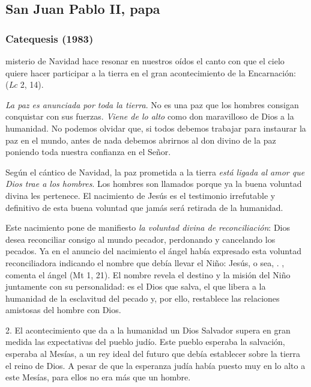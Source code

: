 \newsection


\subsection{San Juan Pablo II, papa}

\subsubsection{Catequesis (1983)}


\begin{body}
	 misterio de Navidad hace resonar en nuestros oídos el canto con que el cielo quiere hacer participar a la tierra en el gran acontecimiento de la Encarnación:  (\emph{Lc} 2, 14).
	
	\emph{La paz es anunciada por toda la tierra}. No es una paz que los hombres consigan conquistar con sus fuerzas. \emph{Viene de lo alto} como don maravilloso de Dios a la humanidad. No podemos olvidar que, si todos debemos trabajar para instaurar la paz en el mundo, antes de nada debemos abrirnos al don divino de la paz poniendo toda nuestra confianza en el Señor.
	
	Según el cántico de Navidad, la paz prometida a la tierra \emph{está ligada al amor que Dios trae a los hombres}. Los hombres son llamados  porque ya la buena voluntad divina les pertenece. El nacimiento de Jesús es el testimonio irrefutable y definitivo de esta buena voluntad que jamás será retirada de la humanidad.
	
	Este nacimiento pone de manifiesto \emph{la voluntad divina de reconciliación}: Dios desea reconciliar consigo al mundo pecador, perdonando y cancelando los pecados. Ya en el anuncio del nacimiento el ángel había expresado esta voluntad reconciliadora indicando el nombre que debía llevar el Niño: Jesús, o sea, . , comenta el ángel (Mt 1, 21). El nombre revela el destino y la misión del Niño juntamente con su personalidad: es el Dios que salva, el que libera a la humanidad de la esclavitud del pecado y, por ello, restablece las relaciones amistosas del hombre con Dios.
	
	2. El acontecimiento que da a la humanidad un Dios Salvador supera en gran medida las expectativas del pueblo judío. Este pueblo esperaba la salvación, esperaba al Mesías, a un rey ideal del futuro que debía establecer sobre la tierra el reino de Dios. A pesar de que la esperanza judía había puesto muy en lo alto a este Mesías, para ellos no era más que un hombre.
	

\end{body}
